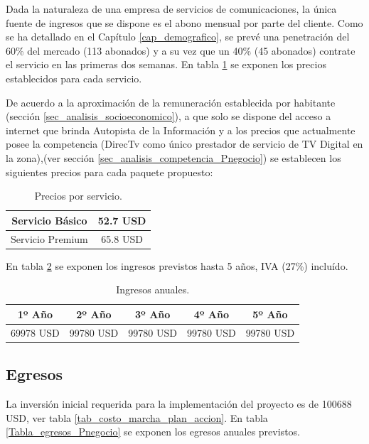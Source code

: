 \documentclass[12pt,a4paper]{book}
\begin{document}
Dada la naturaleza de una empresa de servicios de comunicaciones, la única fuente de ingresos que se dispone es el abono mensual por parte del cliente. Como se ha detallado en el Capítulo \ref{cap_demografico}, se prevé una penetración del 60\% del mercado (113 abonados) y a su vez que un 40\% (45 abonados) contrate el servicio en las primeras dos semanas. En tabla \ref{Tabla_preciosServicios_Pnegocio} se exponen los precios establecidos para cada servicio.

\medskip

De acuerdo a la aproximación de la remuneración establecida por habitante (sección \ref{sec_analisis_socioeconomico}), a que solo se dispone del acceso a internet que brinda Autopista de la Información y a los precios que actualmente posee la competencia (DirecTv como único prestador de servicio de TV Digital en la zona),(ver sección \ref{sec_analisis_competencia_Pnegocio}) se establecen los siguientes precios para cada paquete propuesto:


\begin{table}
\centering
\begin{tabular}{|c|c|}
\hline
Servicio Básico & 52.7 USD \\
\hline
Servicio Premium & 65.8 USD \\
\hline
\end{tabular}

\caption{Precios por servicio.}
\label{Tabla_preciosServicios_Pnegocio}
\end{table}


En tabla \ref{Tabla_ingresos_Pnegocio} se exponen los ingresos previstos hasta 5 años, IVA (27\%) incluído.

\begin{table} [H]
\centering
\begin{tabular}{|c|c|c|c|c|}
\hline
1º Año & 2º Año & 3º Año & 4º Año & 5º Año \\
\hline
69978 USD & 99780 USD & 99780 USD & 99780 USD & 99780 USD  \\ 
\hline
\end{tabular}

\caption{Ingresos anuales.}
\label{Tabla_ingresos_Pnegocio}
\end{table}


\subsection{Egresos}

La inversión inicial requerida para la implementación del proyecto es de 100688 USD, ver tabla \ref{tab_costo_marcha_plan_accion}. En tabla \ref{Tabla_egresos_Pnegocio} se exponen los egresos anuales previstos.
\end{document}
